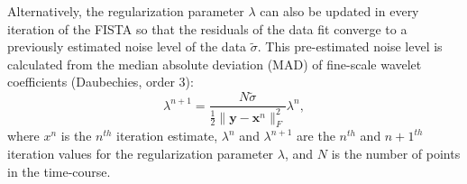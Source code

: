 Alternatively, the regularization parameter $\lambda$ can also be updated in every iteration of the FISTA so that the residuals of the data fit converge to a previously estimated noise level of the data $\tilde{\sigma}$. This pre-estimated noise level is calculated from the median absolute deviation (MAD) of fine-scale wavelet coefficients (Daubechies, order 3):
\begin{equation}
    \lambda^{n+1} = \frac{N \tilde{\sigma}}{\frac{1}{2} \| \mathbf{y} - \mathbf{x}^n \|_F^2} \lambda^n,
\label{eq:std}
\end{equation}
where $x^n$ is the $n^{th}$ iteration estimate, $\lambda^n$ and $\lambda^{n+1}$ are the $n^{th}$ and $n+1^{th}$ iteration values for the regularization parameter $\lambda$, and $N$ is the number of points in the time-course. %

